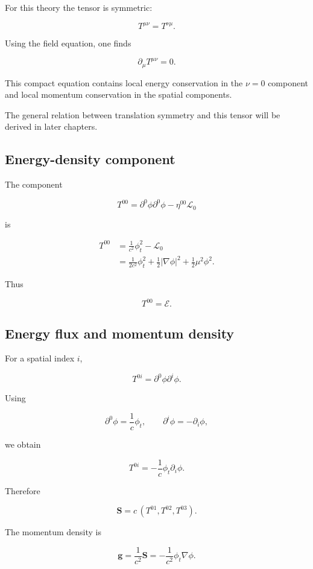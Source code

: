 For this theory the tensor is symmetric:

\[
T^{\mu\nu}=T^{\nu\mu}.
\]

Using the field equation, one finds

\[
\boxed{
\partial_{\mu}T^{\mu\nu}=0
}.
\]

This compact equation contains local energy conservation in the \(\nu=0\) component and local momentum conservation in the spatial components.

The general relation between translation symmetry and this tensor will be derived in later chapters.

\subsection{Energy-density component}

The component

\[
T^{00}
=
\partial^{0}\phi\partial^{0}\phi
-
\eta^{00}\mathcal{L}_{0}
\]

is

\[
\begin{aligned}
T^{00}
&=
\frac{1}{c^{2}}\phi_{t}^{2}
-
\mathcal{L}_{0}\\
&=
\frac{1}{2c^{2}}\phi_{t}^{2}
+
\frac{1}{2}|\nabla\phi|^{2}
+
\frac{1}{2}\mu^{2}\phi^{2}.
\end{aligned}
\]

Thus

\[
\boxed{T^{00}=\mathcal{E}}.
\]

\subsection{Energy flux and momentum density}

For a spatial index \(i\),

\[
T^{0i}
=
\partial^{0}\phi\partial^{i}\phi.
\]

Using

\[
\partial^{0}\phi
=
\frac{1}{c}\phi_{t},
\qquad
\partial^{i}\phi
=
-\partial_{i}\phi,
\]

we obtain

\[
\boxed{
T^{0i}
=
-
\frac{1}{c}
\phi_{t}\partial_{i}\phi
}.
\]

Therefore

\[
\boxed{
\mathbf{S}=c\,(T^{01},T^{02},T^{03})
}.
\]

The momentum density is

\[
\boxed{
\mathbf{g}
=
\frac{1}{c^{2}}\mathbf{S}
=
-
\frac{1}{c^{2}}\phi_{t}\nabla\phi
}.
\]

